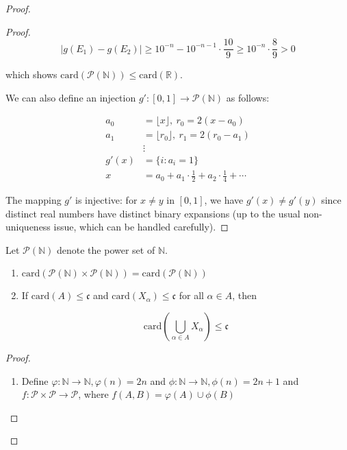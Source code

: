 \begin{proof}
\begin{proof}
    \[
        \left| g(E_1) - g(E_2)\right| \ge 10^{-n} - 10^{-n-1} \cdot \frac{10}{9} \ge 10^{-n} \cdot \frac{8}{9} > 0
    \]

    which shows $\mathrm{card}(\mathcal{P}(\mathbb{N})) \le \mathrm{card}(\mathbb{R})$.

    We can also define an injection $g': [0,1] \to \mathcal{P}(\mathbb{N})$ as follows:

    \begin{align*}
        a_0 &= \lfloor x \rfloor,\: r_0 = 2(x - a_0) \\
        a_1 &= \lfloor r_0 \rfloor,\: r_1 = 2(r_0 - a_1) \\
        &\vdots \\
        g'(x) &= \{ i: a_i = 1 \} \\
        x &= a_0  + a_1 \cdot \frac{1}{2} + a_2 \cdot \frac{1}{4} + \cdots
    \end{align*}

    The mapping $g'$ is injective: for $x \neq y$ in $[0,1]$, we have $g'(x) \neq g'(y)$ since distinct real numbers have distinct binary expansions (up to the usual non-uniqueness issue, which can be handled carefully).

\end{proof}

\begin{thm}
    Let $\mathcal{P}(\mathbb{N})$ denote the power set of $\mathbb{N}$.

    \begin{enumerate}
        \item $\mathrm{card}(\mathcal{P}(\mathbb{N}) \times \mathcal{P}(\mathbb{N})) = \mathrm{card}(\mathcal{P}(\mathbb{N}))$

        \item If $\mathrm{card}(A) \le \mathfrak{c}$ and $\mathrm{card}(X_{\alpha}) \le \mathfrak{c}$ for all $\alpha \in A$, then 
        
        \[
        \mathrm{card} \left( \bigcup_{\alpha \in A} X_{\alpha} \right) \le \mathfrak{c} 
        \]
        
    \end{enumerate}
\end{thm}

\begin{proof}
    \begin{enumerate}
        \item  Define $\varphi: \mathbb{N} \to \mathbb{N}, \varphi(n) = 2n$ and $\phi: \mathbb{N} \to \mathbb{N}, \phi(n) = 2n + 1$
    and $f: \mathcal{P} \times \mathcal{P} \to \mathcal{P}$, where $f(A, B) = \varphi(A) \cup \phi(B)$


\end{enumerate}
\end{proof}
\end{proof}
